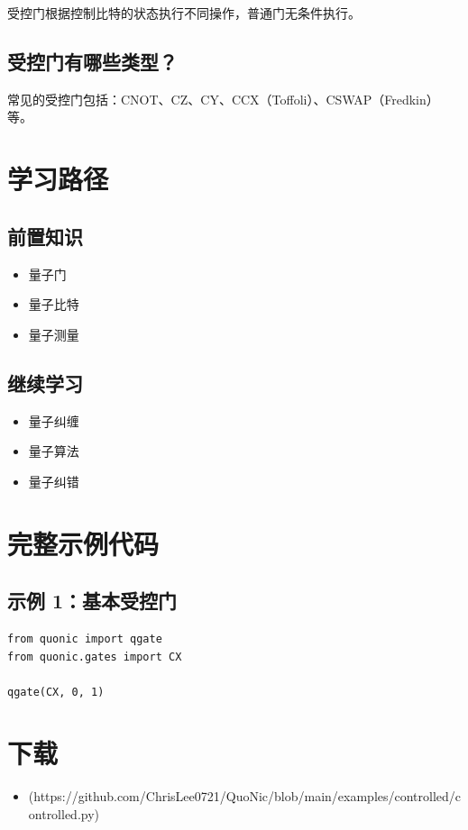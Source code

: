 \documentclass[12pt,a4paper]{article}
\begin{document}
受控门根据控制比特的状态执行不同操作，普通门无条件执行。

\subsection{受控门有哪些类型？}

常见的受控门包括：CNOT、CZ、CY、CCX（Toffoli）、CSWAP（Fredkin）等。

\section{学习路径}

\subsection{前置知识}
\begin{itemize}
  \item 量子门
  \item 量子比特
  \item 量子测量
\end{itemize}

\subsection{继续学习}
\begin{itemize}
  \item 量子纠缠
  \item 量子算法
  \item 量子纠错
\end{itemize}

\section{完整示例代码}

\subsection{示例 1：基本受控门}

\begin{verbatim}
from quonic import qgate
from quonic.gates import CX

qgate(CX, 0, 1)
\end{verbatim}

\section{下载}

\begin{itemize}
  \item [controlled.py](https://github.com/ChrisLee0721/QuoNic/blob/main/examples/controlled/controlled.py)
\end{itemize}
\end{document}
